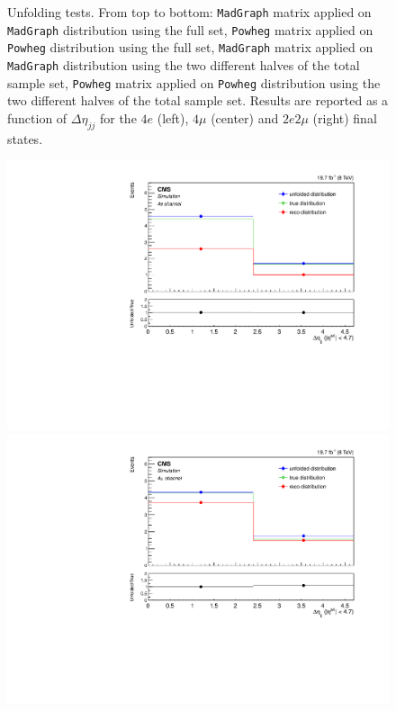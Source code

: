 \begin{figure}[hbtp]
\begin{center}
      \caption{Unfolding tests. From top to bottom: \texttt{MadGraph} matrix applied on \texttt{MadGraph} distribution using the full set, \texttt{Powheg} matrix applied on \texttt{Powheg} distribution using the full set,  \texttt{MadGraph} matrix applied on \texttt{MadGraph} distribution using the two different halves of the total sample set, \texttt{Powheg} matrix applied on \texttt{Powheg} distribution using the two different halves of the total sample set. Results are reported as a function of $\Delta\eta_{jj}$ for the $4e$ (left), $4\mu$ (center) and $2e2\mu$ (right) final states.}
    \label{fig:MCtest_Deta1}
  \end{center}
\end{figure}

\begin{figure}[hbtp]
  \begin{center}
    \includegraphics[width=0.8\cmsFigWidth]{Figures/Unfolding/MCTests/Deta_ZZTo4e_MadMatrix_PowDistr_FullSample_fr}     
    \includegraphics[width=0.8\cmsFigWidth]{Figures/Unfolding/MCTests/Deta_ZZTo4m_MadMatrix_PowDistr_FullSample_fr}     

\end{center}
\end{figure}
